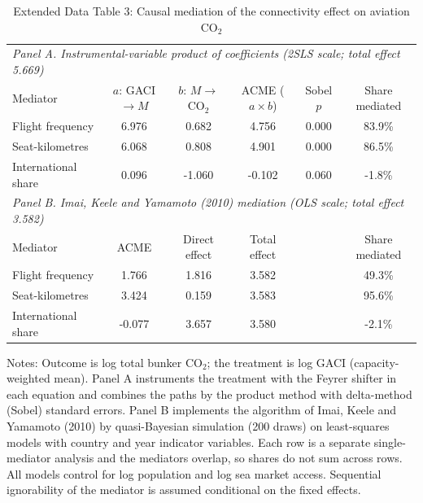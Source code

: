 \documentclass[12pt]{article}
\begin{document}
\begin{table}[htbp]
\centering
\begin{threeparttable}
\caption{Extended Data Table 3: Causal mediation of the connectivity effect on aviation CO$_2$}
\label{tab:mediation}
\footnotesize
\begin{tabular}{lccccc}
\toprule
\multicolumn{6}{l}{\textit{Panel A. Instrumental-variable product of coefficients (2SLS scale; total effect 5.669)}} \\
Mediator & $a$: GACI$\rightarrow M$ & $b$: $M\rightarrow$CO$_2$ & ACME ($a\times b$) & Sobel $p$ & Share mediated \\
\midrule
  Flight frequency & 6.976 & 0.682 & 4.756 & 0.000 & 83.9\% \\
  Seat-kilometres & 6.068 & 0.808 & 4.901 & 0.000 & 86.5\% \\
  International share & 0.096 & -1.060 & -0.102 & 0.060 & -1.8\% \\
\midrule
\multicolumn{6}{l}{\textit{Panel B. Imai, Keele and Yamamoto (2010) mediation (OLS scale; total effect 3.582)}} \\
Mediator & ACME & Direct effect & Total effect & & Share mediated \\
\midrule
  Flight frequency & 1.766 & 1.816 & 3.582 & & 49.3\% \\
  Seat-kilometres & 3.424 & 0.159 & 3.583 & & 95.6\% \\
  International share & -0.077 & 3.657 & 3.580 & & -2.1\% \\
\bottomrule
\end{tabular}
\begin{tablenotes}[flushleft]
\footnotesize
\item Notes: Outcome is log total bunker CO$_2$; the treatment is log GACI (capacity-weighted mean). Panel A instruments the treatment with the Feyrer shifter in each equation and combines the paths by the product method with delta-method (Sobel) standard errors. Panel B implements the algorithm of Imai, Keele and Yamamoto (2010) by quasi-Bayesian simulation (200 draws) on least-squares models with country and year indicator variables. Each row is a separate single-mediator analysis and the mediators overlap, so shares do not sum across rows. All models control for log population and log sea market access. Sequential ignorability of the mediator is assumed conditional on the fixed effects.
\end{tablenotes}
\end{threeparttable}
\end{table}
\end{document}
